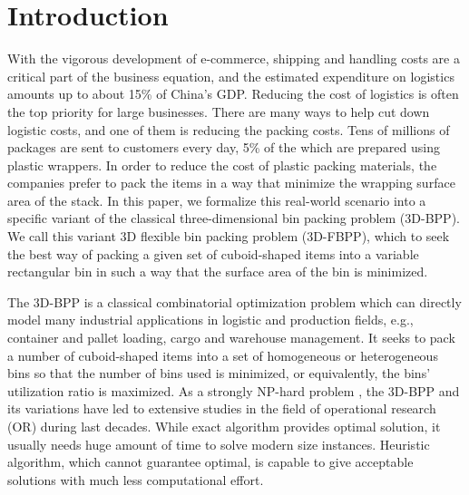 \section{Introduction}
\label{sec:intro}

With the vigorous development of e-commerce, shipping and handling costs are
a critical part of the business equation, and the estimated expenditure on
logistics amounts up to about 15\% of China's GDP. 
Reducing the cost of logistics is often the top priority for large businesses. 
There are many ways to help cut down logistic costs, and one of them is reducing
the packing costs. %
Tens of millions of packages are sent to customers every day, 5\% of the which are prepared using plastic wrappers. In order to reduce the cost of plastic packing materials, the companies prefer to pack the items in a way that minimize the wrapping surface area of the stack. 
In this paper, we formalize this real-world scenario into a specific variant 
of the classical three-dimensional bin packing problem (3D-BPP). 
We call this variant 3D flexible bin packing problem (3D-FBPP), which to seek 
the best way of packing a given set of cuboid-shaped items into a variable rectangular bin  in such a way that the surface area of the bin 
is minimized. 

The 3D-BPP is a classical combinatorial optimization problem which can directly model many industrial applications in logistic and production fields, e.g., 
container and pallet loading, cargo and warehouse management. %
It seeks to pack a number of cuboid-shaped items  into a set of homogeneous or heterogeneous bins so that the number of bins used is minimized, or equivalently, the bins’ utilization ratio is maximized. As a strongly NP-hard problem \cite{martello2000three}, the 3D-BPP and its variations have led to extensive studies in the field of operational research (OR) during last decades. While exact algorithm provides optimal solution, it usually needs huge amount of time to solve modern size instances. Heuristic algorithm, which cannot guarantee optimal, is capable to give acceptable solutions with much less computational effort. 

